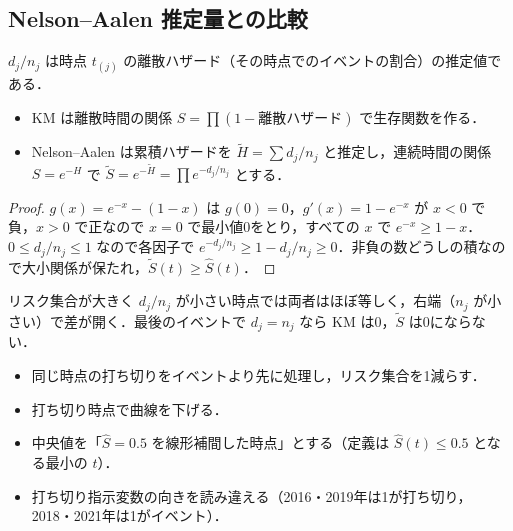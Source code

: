 \subsection{Nelson--Aalen 推定量との比較}
$d_j/n_j$ は時点 $t_{(j)}$ の離散ハザード（その時点でのイベントの割合）の推定値である．
\begin{itemize}
\item KM は離散時間の関係 $S=\prod(1-\text{離散ハザード})$ で生存関数を作る．
\item Nelson--Aalen は累積ハザードを $\tilde H=\sum d_j/n_j$ と推定し，連続時間の関係 $S=e^{-H}$ で $\tilde S=e^{-\tilde H}=\prod e^{-d_j/n_j}$ とする．
\end{itemize}
\begin{proof}
$g(x)=e^{-x}-(1-x)$ は $g(0)=0$，$g'(x)=1-e^{-x}$ が $x<0$ で負，$x>0$ で正なので $x=0$ で最小値0をとり，すべての $x$ で $e^{-x}\ge1-x$．
$0\le d_j/n_j\le1$ なので各因子で $e^{-d_j/n_j}\ge1-d_j/n_j\ge0$．非負の数どうしの積なので大小関係が保たれ，$\tilde S(t)\ge\hat S(t)$．
\end{proof}
リスク集合が大きく $d_j/n_j$ が小さい時点では両者はほぼ等しく，右端（$n_j$ が小さい）で差が開く．最後のイベントで $d_j=n_j$ なら KM は0，$\tilde S$ は0にならない．

\begin{warnbox}
\begin{itemize}
\item 同じ時点の打ち切りをイベントより先に処理し，リスク集合を1減らす．
\item 打ち切り時点で曲線を下げる．
\item 中央値を「$\hat S=0.5$ を線形補間した時点」とする（定義は $\hat S(t)\le0.5$ となる最小の $t$）．
\item 打ち切り指示変数の向きを読み違える（2016・2019年は1が打ち切り，2018・2021年は1がイベント）．
\end{itemize}
\end{warnbox}

